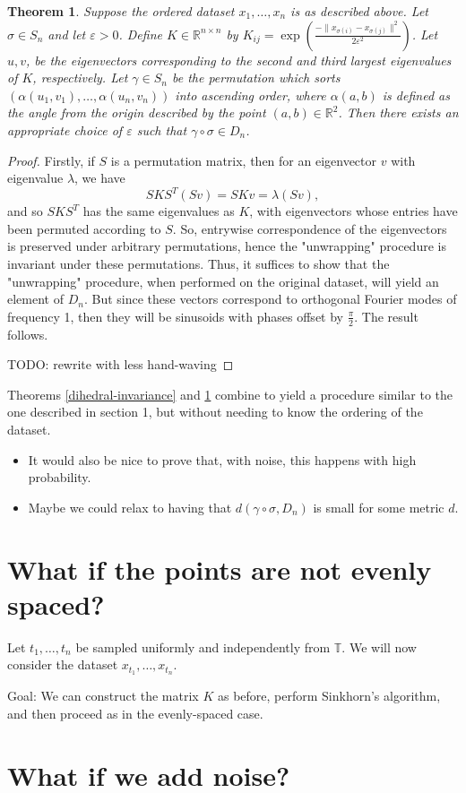 \documentclass[reqno]{amsart}
\renewcommand{\epsilon}{\varepsilon}
\newtheorem{thm}{Theorem}
\begin{document}
\pagebreak
\begin{thm}\label{sin-cos-evecs}
    Suppose the ordered dataset $x_1, \dots, x_n$ is as described above. 
    Let $\sigma \in S_n$ and let $\epsilon > 0$.    
    Define $K \in \mathbb{R}^{n \times n}$ by $K_{ij} = \exp\left( \frac{-\|x_{\sigma(i)} - x_{\sigma(j)} \|^2}{2\epsilon^2}\right)$.
    Let $u, v$, be the eigenvectors corresponding to the second and third largest eigenvalues of $K$, respectively.
    Let $\gamma \in S_n$ be the permutation which sorts $(\alpha(u_1, v_1), \dots, \alpha(u_n, v_n))$ into ascending order, where $\alpha(a,b)$ is defined as the angle from the origin described by the point $(a,b) \in \mathbb{R}^2$.
    Then there exists an appropriate choice of $\epsilon$ such that $\gamma \circ \sigma \in D_n$.
\end{thm}
\begin{proof}
    Firstly, if $S$ is a permutation matrix, then for an eigenvector $v$ with eigenvalue $\lambda$, we have
    \[
    SKS^T (Sv) = SKv = \lambda (Sv),
    \]
    and so $SKS^T$ has the same eigenvalues as $K$, with eigenvectors whose entries have been permuted according to $S$.
    So, entrywise correspondence of the eigenvectors is preserved under arbitrary permutations, hence the "unwrapping" procedure is invariant under these permutations.
    Thus, it suffices to show that the "unwrapping" procedure, when performed on the original dataset, will yield an element of $D_n$.
    But since these vectors correspond to orthogonal Fourier modes of frequency 1, then they will be sinusoids with phases offset by $\frac{\pi}{2}$.
    The result follows.
    
    TODO: rewrite with less hand-waving
\end{proof}

Theorems \ref{dihedral-invariance} and \ref{sin-cos-evecs} combine to yield a procedure similar to the one described in section 1, but without needing to know the ordering of the dataset.

\begin{itemize}
    
    \item It would also be nice to prove that, with noise, this happens with high probability.
    
    \item Maybe we could relax to having that $d(\gamma \circ \sigma, D_n)$ is small for some metric $d$.
\end{itemize}

\section{What if the points are not evenly spaced?}
Let $t_1, \dots, t_n$ be sampled uniformly and independently from $\mathbb{T}$.
We will now consider the dataset $x_{t_1}, \dots, x_{t_n}$.

Goal: We can construct the matrix $K$ as before, perform Sinkhorn's algorithm, and then proceed as in the evenly-spaced case.

\section{What if we add noise?}
\end{document}
